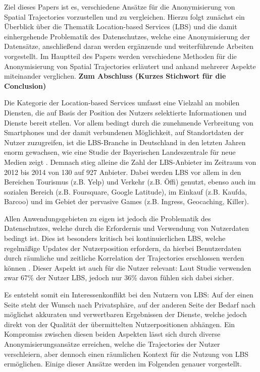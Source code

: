 Ziel dieses Papers ist es, verschiedene Ansätze für die Anonymisierung von Spatial Trajectories vorzustellen und zu vergleichen. Hierzu folgt zunächst ein Überblick über die Thematik Location-based Services (LBS) und die damit einhergehende Problematik des Datenschutzes, welche eine Anonymisierung der Datensätze, anschließend daran werden ergänzende und weiterführende Arbeiten vorgestellt. Im Hauptteil des Papers werden verschiedene Methoden für die Anonymisierung von Spatial Trajectories erläutert und anhand mehrerer Aspekte miteinander verglichen. \textbf{Zum Abschluss (Kurzes Stichwort für die Conclusion)}

Die Kategorie der Location-based Services umfasst eine Vielzahl an mobilen Diensten, die auf Basis der Position des Nutzers selektierte Informationen und Dienste bereit stellen. Vor allem bedingt durch die zunehmende Verbreitung von Smartphones und der damit verbundenen Möglichkeit, auf Standortdaten der Nutzer zuzugreifen, ist die LBS-Branche in Deutschland in den letzten Jahren enorm gewachsen, wie eine Studie der Bayerischen Landeszentrale für neue Medien zeigt \cite{Consulting2014}. Demnach stieg alleine die Zahl der LBS-Anbieter im Zeitraum von 2012 bis 2014 von 130 auf 927 Anbieter. Dabei werden LBS vor allem in den Bereichen Tourismus (z.B. Yelp) und Verkehr (z.B. Öffi) genutzt, ebenso auch im sozialen Bereich (z.B. Foursquare, Google Latitude), im Einkauf (z.B. Kaufda, Barcoo) und im Gebiet der pervasive Games (z.B. Ingress, Geocaching, Killer).

Allen Anwendungsgebieten zu eigen ist jedoch die Problematik des Datenschutzes, welche durch die Erfordernis und Verwendung von Nutzerdaten bedingt ist. Dies ist besonders kritisch bei kontinuierlichen LBS, welche regelmäßige Updates der Nutzerposition erfordern, da hierbei Benutzerdaten durch räumliche und zeitliche Korrelation der Trajectories erschlossen werden können \cite{Chow2011}. Dieser Aspekt ist auch für die Nutzer relevant: Laut Studie verwenden zwar 67\% der Nutzer LBS, jedoch nur 36\% davon fühlen sich dabei sicher.

Es entsteht somit ein Interessenkonflikt bei den Nutzern von LBS: Auf der einen Seite steht der Wunsch nach Privatsphäre, auf der anderen Seite der Bedarf nach möglichst akkuraten und verwertbaren Ergebnissen der Dienste, welche jedoch direkt von der Qualität der übermittelten Nutzerpositionen abhängen. Ein Kompromiss zwischen diesen beiden Aspekten lässt sich durch diverse Anonymisierungsansätze erreichen, welche die Trajectories der Nutzer verschleiern, aber dennoch einen räumlichen Kontext für die Nutzung von LBS ermöglichen. Einige dieser Ansätze werden im Folgenden genauer vorgestellt.